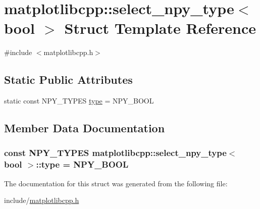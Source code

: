 \hypertarget{structmatplotlibcpp_1_1select__npy__type_3_01bool_01_4}{}\section{matplotlibcpp\+:\+:select\+\_\+npy\+\_\+type$<$ bool $>$ Struct Template Reference}
\label{structmatplotlibcpp_1_1select__npy__type_3_01bool_01_4}


{\ttfamily \#include $<$matplotlibcpp.\+h$>$}

\subsection*{Static Public Attributes}
\begin{DoxyCompactItemize}
\item 
static const N\+P\+Y\+\_\+\+T\+Y\+P\+ES \hyperlink{structmatplotlibcpp_1_1select__npy__type_3_01bool_01_4_a79dc3db61a3b0f4796a29d067d5dd374}{type} = N\+P\+Y\+\_\+\+B\+O\+OL
\end{DoxyCompactItemize}


\subsection{Member Data Documentation}
\subsubsection[{\texorpdfstring{type}{type}}]{\setlength{\rightskip}{0pt plus 5cm}const N\+P\+Y\+\_\+\+T\+Y\+P\+ES {\bf matplotlibcpp\+::select\+\_\+npy\+\_\+type}$<$ bool $>$\+::type = N\+P\+Y\+\_\+\+B\+O\+OL\hspace{0.3cm}{\ttfamily [static]}}\hypertarget{structmatplotlibcpp_1_1select__npy__type_3_01bool_01_4_a79dc3db61a3b0f4796a29d067d5dd374}{}\label{structmatplotlibcpp_1_1select__npy__type_3_01bool_01_4_a79dc3db61a3b0f4796a29d067d5dd374}


The documentation for this struct was generated from the following file\+:\begin{DoxyCompactItemize}
\item 
include/\hyperlink{matplotlibcpp_8h}{matplotlibcpp.\+h}\end{DoxyCompactItemize}
